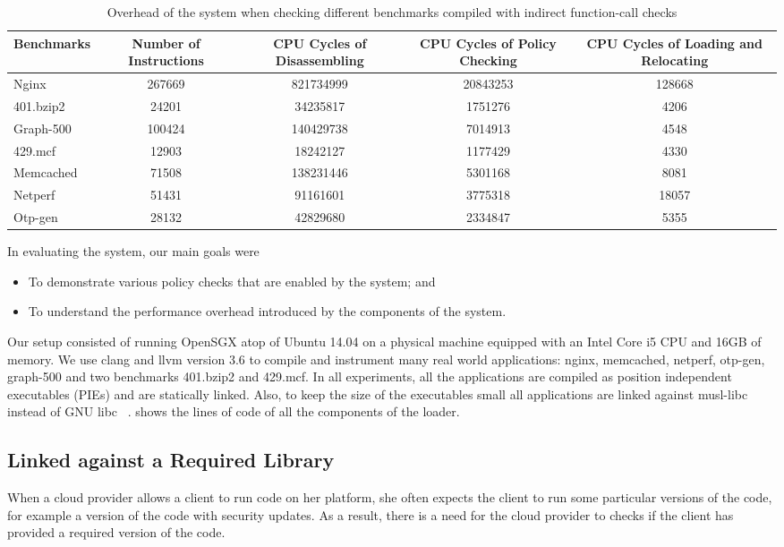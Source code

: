 \begin{table*}[t]
\centering
\footnotesize{
\begin{tabular}{|l|c|c|c|c|}
\hline
 \bf Benchmarks                    & \bf Number of Instructions & \bf CPU Cycles of  Disassembling & \bf CPU Cycles of Policy Checking & \bf CPU Cycles of Loading and Relocating\\
\hline
Nginx & 267669 & 821734999 & 20843253 & 128668\\
\hline
401.bzip2 & 24201 & 34235817 & 1751276 & 4206\\
\hline
Graph-500 & 100424 & 140429738 & 7014913 & 4548\\
\hline
429.mcf & 12903 & 18242127 & 1177429 & 4330\\
\hline
Memcached & 71508 & 138231446 & 5301168 & 8081\\
\hline
Netperf & 51431 & 91161601 & 3775318 & 18057\\

Otp-gen & 28132 & 42829680 & 2334847 & 5355\\
\hline
\end{tabular}
}
\caption{Overhead of the system when checking different benchmarks compiled with indirect function-call checks}{\label{table:checkingindirectfunccall}}
\end{table*}
In evaluating the system, our main goals were 
\begin{itemize}
\item To demonstrate various policy checks that are enabled by the system; and
\item To understand the performance overhead introduced by the components of the system. 
\end{itemize}
Our setup consisted of running OpenSGX atop of Ubuntu 14.04 on a physical machine  equipped 
with an Intel Core i5 CPU and 16GB of memory. We use clang and llvm version 3.6 to compile 
and instrument many real world applications: nginx, memcached, netperf, otp-gen, graph-500 
and two benchmarks 401.bzip2 and 429.mcf. In all experiments, all the applications are compiled 
as position independent executables (PIEs) and are statically linked. Also, to keep the size of 
the executables small all applications are linked against musl-libc ~\cite{musl-libc} instead 
of GNU libc ~\cite{GNU libc}.  shows the lines of code of all the components of the
loader.

\subsection{Linked against a Required Library}
When a cloud provider allows a client to run code on her platform, she often expects the client 
to run some particular versions of the code, for example a version of the code with security updates. 
As a result, there is a need for the cloud provider to checks if the client has provided a required 
version of the code.

